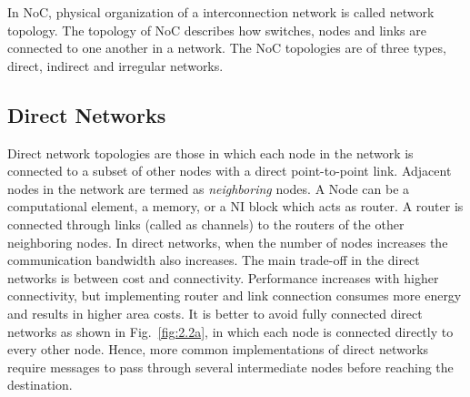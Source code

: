 In NoC, physical organization of a interconnection network is called network topology. The topology of NoC describes how switches, nodes and links are connected to one another in a network. The NoC topologies are of three types, direct, indirect and irregular networks.

\subsection{Direct Networks}

Direct network topologies are those in which each node in the network is connected to a subset of other nodes with a direct point-to-point link. Adjacent nodes in the network are termed as \textit{neighboring} nodes. A Node can be a computational element, a memory, or a NI block which acts as router. A router is connected through links (called as channels) to the routers of the other neighboring nodes. In direct networks, when the number of nodes increases the communication bandwidth also increases. The main trade-off in the direct networks is between cost and connectivity. Performance increases with higher connectivity, but implementing router and link connection consumes more energy and results in higher area costs. It is better to avoid fully connected direct networks as shown in Fig.~\ref{fig:2.2a}, in which each node is connected directly to every other node. Hence, more common implementations of direct networks require messages to pass through several intermediate nodes before reaching the destination.


